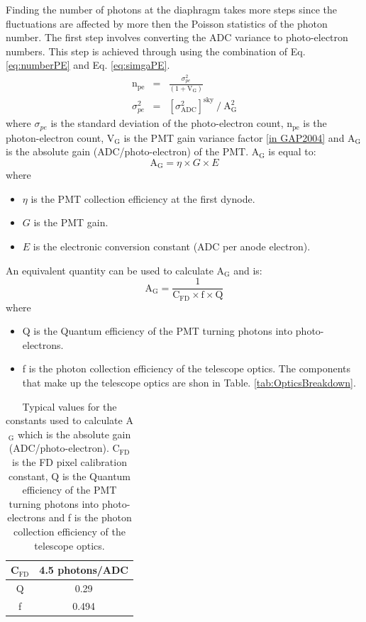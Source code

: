 Finding the number of photons at the diaphragm takes more steps since the fluctuations are affected by more then the Poisson statistics of the photon number. The first step involves converting the ADC variance to photo-electron numbers. This step is achieved through using the combination of Eq. \ref{eq:numberPE} and Eq. \ref{eq:simgaPE}.
\begin{eqnarray}
\mathrm{n}_{\mathrm{pe}} &=& \frac{\sigma^2_{pe}}{(1 + \mathrm{V}_{\mathrm{G}})} \label{eq:numberPE} \\
\sigma^2_{pe} &=& [\sigma^2_{\mathrm{ADC}}]^{\mathrm{sky}} \ / \ \mathrm{A}^2_{\mathrm{G}} \label{eq:simgaPE}
\end{eqnarray}
where $\sigma_{pe}$ is the standard deviation of the photo-electron count, n$_{\mathrm{pe}}$ is the photon-electron count, V$_{\mathrm{G}}$ is the PMT gain variance factor \ref{in GAP2004} and A$_{\mathrm{G}}$ is the absolute gain (ADC/photo-electron) of the PMT. A$_{\mathrm{G}}$ is equal to:
\begin{equation}\label{eq:abs_gain}
\mathrm{A}_{\mathrm{G}} = \eta \times G \times E 
\end{equation}
where
\begin{itemize}
\item[] $\eta$ is the PMT collection efficiency at the first dynode.
\item[] $G$ is the PMT gain.
\item[] $E$ is the electronic conversion constant (ADC per anode electron).
\end{itemize}
An equivalent quantity can be used to calculate $\mathrm{A}_{\mathrm{G}}$ and is:
\begin{equation}\label{eq:abs_gain_alt}
\mathrm{A}_{\mathrm{G}} = \frac{1}{\mathrm{C}_{\mathrm{FD}}\times \mathrm{f} \times \mathrm{Q}}
\end{equation}
where
\begin{itemize}
\item[] Q is the Quantum efficiency of the PMT turning photons into photo-electrons.
\item[] f is the photon collection efficiency of the telescope optics. The components that make up the telescope optics are shon in Table. \ref{tab:OpticsBreakdown}.
\end{itemize}

\vspace{3mm}
\begin{table}[h]
\begin{center}
\begin{tabular}{|c|c|}
\hline 
C$_{\mathrm{FD}}$ & 4.5 photons/ADC \\
\hline
Q & 0.29 \\
\hline
f & 0.494 \\
\hline
\end{tabular} 
\end{center}
\caption{Typical values for the constants used to calculate A$_{\mathrm{G}}$ which is the absolute gain (ADC/photo-electron). $\mathrm{C}_{\mathrm{FD}}$ is the FD pixel calibration constant, Q is the Quantum efficiency of the PMT turning photons into photo-electrons and f is the photon collection efficiency of the telescope optics.} \label{tab:CFD_Q_F}
\end{table} 

